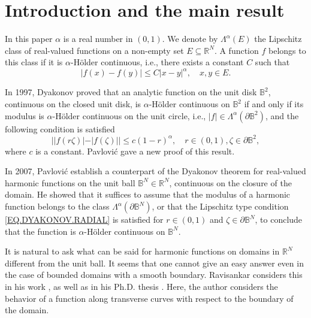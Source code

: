 \documentclass[10pt]{amsart}
\theoremstyle{definition}
\numberwithin{equation}{section}
\begin{document}
\maketitle

\section{Introduction and the main result}

In this paper $\alpha$ is a real number in $(0,1)$. We denote by $\Lambda^\alpha(E)$  the Lipschitz class of real-valued
functions on a non-empty set $E\subseteq \mathbb{R}^N$.                A function $f$ belongs to this    class  if it is
$\alpha$-H\"{o}lder  continuous, i.e.,  there exists  a  constant $C$ such that
\begin{equation*}
|f(x)  -  f (y)| \le  C  |x-y|^{\alpha},\quad x, y\in E.
\end{equation*}

In 1997, Dyakonov \cite{DYAKONOV.ACTM} proved that an analytic function on  the  unit disk $\mathbb {B} ^2$,  continuous
on the      closed unit disk,        is $\alpha$-H\"{o}lder continuous on $\mathbb {B} ^2$ if and only if its modulus is
$\alpha$-H\"{o}lder  continuous on the unit circle, i.e.,  $|f|\in \Lambda ^ \alpha (\partial \mathbb {B}^2)$,   and the
following  condition   is  satisfied
\begin{equation}\label{EQ.DYAKONOV.RADIAL}
| |f(r\zeta) | - |f(\zeta)|  |\le c (1-r)^ \alpha,\quad r\in (0,1),\zeta\in \partial \mathbb {B}^2,
\end{equation}
where  $c$ is a constant.  Pavlovi\'{c}  \cite{PAVLOVIC.ACTM}  gave a new proof of this result.

In 2007, Pavlovi\'{c} \cite{PAVLOVIC.RMI} establish  a counterpart of the    Dyakonov theorem   for real-valued harmonic
functions on  the  unit  ball  $\mathbb{B}^N\in \mathbb{R}^N$, continuous on the closure of the domain. He   showed that
it suffices to assume that the modulus of a harmonic function                                       belongs to the class
$\Lambda ^\alpha (\partial \mathbb{B}^N)$, or that the Lipschitz type  condition \eqref{EQ.DYAKONOV.RADIAL}           is
satisfied for $r\in (0,1)$ and $\zeta\in \partial \mathbb {B}^N$,                       to conclude that the function is
$\alpha$-H\"{o}lder continuous on $\mathbb{B}^N$.

It is natural  to ask  what can be said  for harmonic functions on  domains  in $\mathbb{R}^N$ different  from the  unit
ball.           It seems that one cannot give an easy answer even in the case of bounded domains with a smooth boundary.
Ravisankar considers this in his work \cite{RAVISANKAR.CVEE},      as well as in his Ph.D. thesis \cite{RAVISANKAR.PHD}.
Here, the author considers the behavior of a     function along transverse curves with respect to the boundary of    the
domain.
\end{document}
